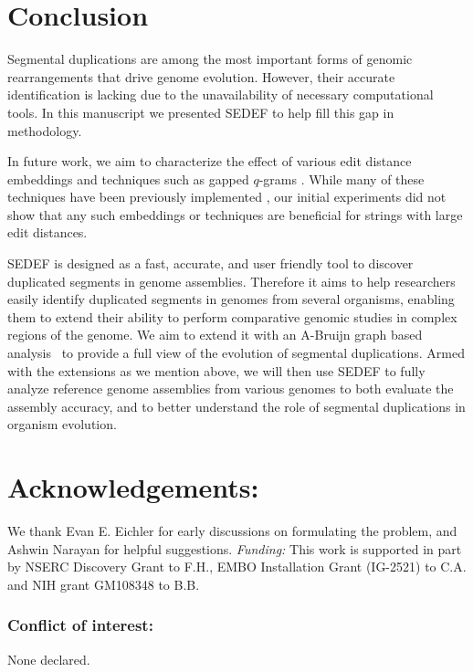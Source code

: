 \documentclass{article}
\begin{document}
\section{Conclusion}
 Segmental duplications are among the most important forms of genomic rearrangements that drive genome evolution. However, their accurate identification is lacking due to the unavailability of necessary computational tools. In this manuscript we presented SEDEF to help fill this gap in methodology.
 
 In future work, we aim to characterize the effect of various edit distance embeddings and  techniques such as gapped $q$-grams \citep{Burkhardt2002,BarYossef2004}. While many of these techniques have been previously implemented \citep{Hanada2011}, our initial experiments did not show that any such embeddings or techniques are beneficial for strings with large edit distances. 
 
 SEDEF is designed as a fast, accurate, and user friendly tool to discover duplicated segments in genome assemblies. Therefore it aims to help researchers easily identify duplicated segments in genomes from several organisms, enabling them to extend their ability to perform comparative genomic studies in complex regions of the genome. We aim to extend it with an A-Bruijn graph based analysis~\citep{Jiang2007} to provide a full view of the evolution of segmental duplications.
 Armed with the extensions as we mention above, we will then use SEDEF to fully analyze reference genome assemblies from various genomes to both evaluate the assembly accuracy, and to better understand the role of segmental duplications in organism evolution.
 
\section*{Acknowledgements:} 

We thank  Evan E. Eichler for early discussions on formulating the problem, and Ashwin Narayan for helpful suggestions. \emph{Funding:} This work is supported in part by NSERC Discovery Grant to F.H., EMBO Installation Grant (IG-2521) to C.A. and NIH grant GM108348 to B.B. 

\subsubsection*{Conflict of interest:} None declared.
\end{document}
